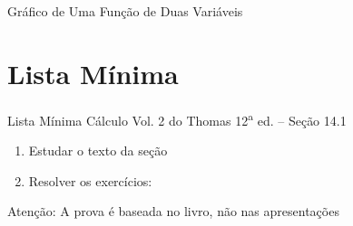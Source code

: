 \begin{frame}{Gráfico de Uma Função de Duas Variáveis}
\end{frame}

\section{Lista Mínima}

\begin{frame}{Lista Mínima}
  Cálculo Vol. 2 do Thomas 12\textsuperscript{a} ed. -- Seção 14.1
  \begin{enumerate}
    \item Estudar o texto da seção
    \item Resolver os exercícios:
  \end{enumerate}

  \vfill
  Atenção: A prova é baseada no livro, não nas apresentações
\end{frame}


